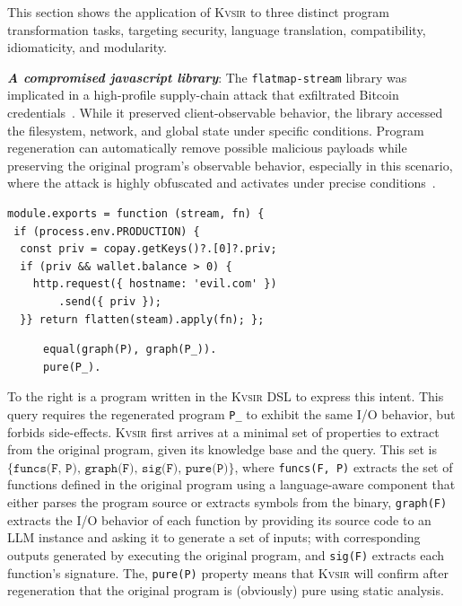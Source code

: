 \documentclass[noacm,sigplan]{acmart}
\newcommand{\sys}{{\scshape Kv{\textalpha}sir}\xspace}
\newcommand{\heading}[1]{\vspace{2pt}\noindent\textbf{\emph{#1}}:\enspace}
\newcommand{\ttt}[1]{\texttt{#1}\xspace}
\begin{document}
This section shows the application of \sys
to three distinct program transformation tasks, 
targeting security, language translation, compatibility,
idiomaticity, and modularity.

\heading{A compromised javascript library}
The \texttt{flatmap-stream} library was implicated in a high-profile
supply-chain attack that exfiltrated Bitcoin credentials~\cite{ev:eurosec:2022}.
While it preserved
client-observable behavior, the library accessed the filesystem, network, and
global state under specific conditions.
Program regeneration can automatically remove possible malicious payloads
while preserving the original program's observable behavior,
especially in this scenario, where the attack is highly obfuscated and 
activates under precise conditions~\cite{harp:ccs:2021}.
\begin{verbatim}
module.exports = function (stream, fn) {
 if (process.env.PRODUCTION) {
  const priv = copay.getKeys()?.[0]?.priv;
  if (priv && wallet.balance > 0) {
    http.request({ hostname: 'evil.com' })
        .send({ priv });
  }} return flatten(steam).apply(fn); };
\end{verbatim}

\begin{figure}
\vspace{-10pt}
\begin{verbatim}
equal(graph(P), graph(P_)).
pure(P_).
\end{verbatim}
\end{figure}
To the right is a program written in the \sys DSL to express this intent.
This query requires the regenerated program \ttt{P\_} to exhibit the same I/O behavior,
but forbids side-effects.
\sys first arrives at a minimal set of properties to extract from the
original program, given its knowledge base and the query.
This set is $\{\texttt{funcs(F, P), graph(F), sig(F), pure(P)}\}$, where
\texttt{funcs(F, P)} extracts the set of functions defined in the original program
using a language-aware component that either parses the program source or extracts
symbols from the binary,
\texttt{graph(F)} extracts the I/O behavior of each function
by providing its source code to an LLM instance and asking it to generate a set of
inputs; with corresponding outputs generated by executing the original program,
and \texttt{sig(F)} extracts each function's signature.
The, \texttt{pure(P)} property means that \sys will confirm after regeneration that the original program is (obviously) pure
using static analysis.
\end{document}
